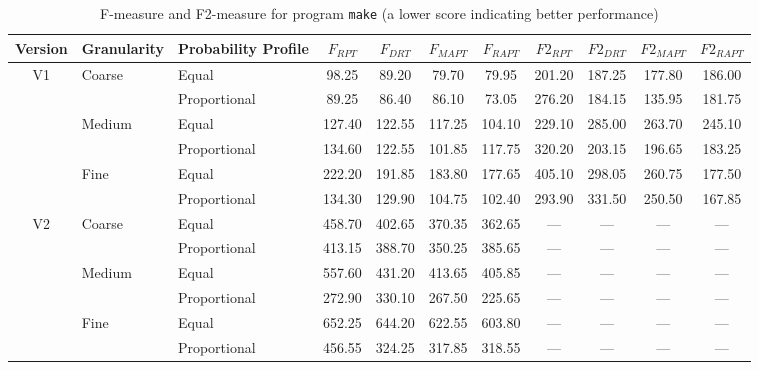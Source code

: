 \documentclass[10pt,journal,compsoc]{IEEEtran}
\begin{document}
\begin{table*}
\caption{F-measure and F2-measure for program \texttt{make} (a lower score indicating better performance)}
\label{tab:Fmake}
\centering
\begin{tabular}{|c|l|l|c|c|c|c|c|c|c|c|} \hline
Version	& Granularity	& Probability Profile	& $F_{RPT}$	& $F_{DRT}$	& $F_{MAPT}$	& $F_{RAPT}$	& $F2_{RPT}$	& $F2_{DRT}$	& $F2_{MAPT}$	 & $F2_{RAPT}$	\\ \hline
V1	& Coarse	& Equal	& 98.25	& 89.20	& 79.70	& 79.95	& 201.20	& 187.25	& 177.80	& 186.00	\\ \cline{3-11}
	& 	& Proportional	& 89.25	& 86.40	& 86.10	& 73.05	& 276.20	& 184.15	& 135.95	& 181.75	\\ \cline{2-11}
	& Medium	& Equal	& 127.40	& 122.55	& 117.25	& 104.10	& 229.10	& 285.00	& 263.70	& 245.10	\\ \cline{3-11}
	& 	& Proportional	& 134.60	& 122.55	& 101.85	& 117.75	& 320.20	& 203.15	& 196.65	& 183.25	\\ \cline{2-11}
	& Fine	& Equal	& 222.20	& 191.85	& 183.80	& 177.65	& 405.10	& 298.05	& 260.75	& 177.50	\\ \cline{3-11}
	& 	& Proportional	& 134.30	& 129.90	& 104.75	& 102.40	& 293.90	& 331.50	& 250.50	& 167.85	\\ \hline
V2	& Coarse	& Equal	& 458.70	& 402.65	& 370.35	& 362.65	& ---	& ---	& ---	& ---	\\ \cline{3-11}
	& 	& Proportional	& 413.15	& 388.70	& 350.25	& 385.65	& ---	& ---	& ---	& ---	\\ \cline{2-11}
	& Medium	& Equal	& 557.60	& 431.20	& 413.65	& 405.85	& ---	& ---	& ---	& ---	\\ \cline{3-11}
	& 	& Proportional	& 272.90	& 330.10	& 267.50	& 225.65	& ---	& ---	& ---	& ---	\\ \cline{2-11}
	& Fine	& Equal	& 652.25	& 644.20	& 622.55	& 603.80	& ---	& ---	& ---	& ---	\\ \cline{3-11}
	& 	& Proportional	& 456.55	& 324.25	& 317.85	& 318.55	& ---	& ---	& ---	& ---	\\ \hline
\end{tabular}
\end{table*}
\end{document}

